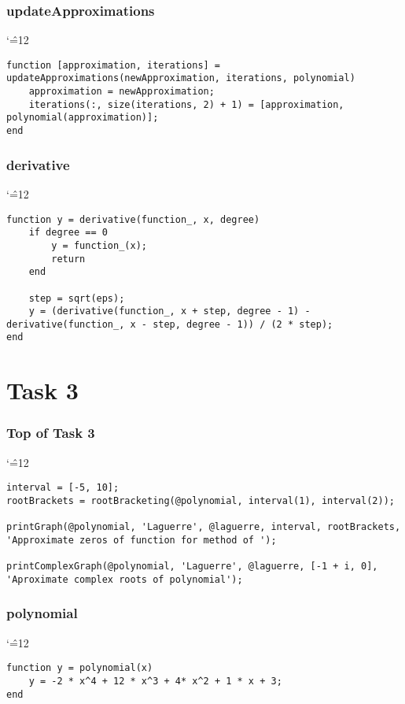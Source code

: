 \documentclass[12pt]{report}
\newenvironment{simplechar}{%
   \catcode`\^=12
}{}
\begin{document}
\subsubsection{updateApproximations}
\begin{simplechar}
\begin{lstlisting}
function [approximation, iterations] = updateApproximations(newApproximation, iterations, polynomial)
    approximation = newApproximation;
    iterations(:, size(iterations, 2) + 1) = [approximation, polynomial(approximation)];
end
\end{lstlisting}
\end{simplechar}

\subsubsection{derivative}
\begin{simplechar}
\begin{lstlisting}
function y = derivative(function_, x, degree)
    if degree == 0
        y = function_(x);
        return
    end

    step = sqrt(eps);
    y = (derivative(function_, x + step, degree - 1) - derivative(function_, x - step, degree - 1)) / (2 * step);
end
\end{lstlisting}
\end{simplechar}

\section{Task 3}

\subsubsection{Top of Task 3}
\begin{simplechar}
\begin{lstlisting}
interval = [-5, 10];
rootBrackets = rootBracketing(@polynomial, interval(1), interval(2));

printGraph(@polynomial, 'Laguerre', @laguerre, interval, rootBrackets, 'Approximate zeros of function for method of ');

printComplexGraph(@polynomial, 'Laguerre', @laguerre, [-1 + i, 0], 'Aproximate complex roots of polynomial');
\end{lstlisting}
\end{simplechar}

\subsubsection{polynomial}
\begin{simplechar}
\begin{lstlisting}
function y = polynomial(x)
    y = -2 * x^4 + 12 * x^3 + 4* x^2 + 1 * x + 3;
end
\end{lstlisting}
\end{simplechar}
\end{document}
